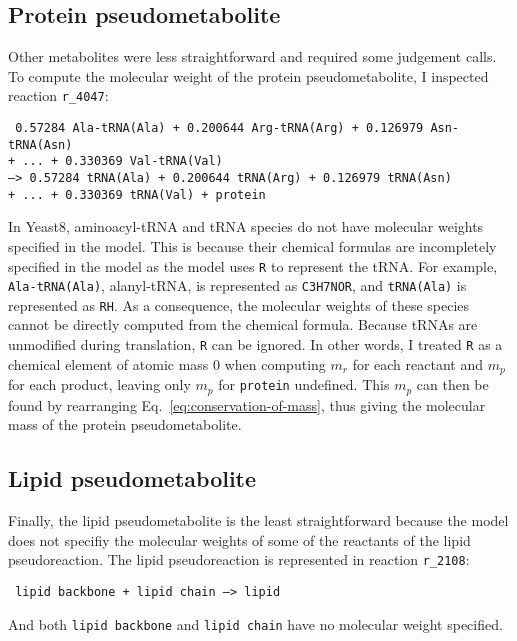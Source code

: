 \subsection{Protein pseudometabolite}
\label{append:model-molweights-protein}

Other metabolites were less straightforward and required some judgement calls.
To compute the molecular weight of the protein pseudometabolite, I inspected reaction \texttt{r\_4047}:

\texttt{
  0.57284 Ala-tRNA(Ala) + 0.200644 Arg-tRNA(Arg) + 0.126979 Asn-tRNA(Asn)\\
  + ... + 0.330369 Val-tRNA(Val) \\
  --> 0.57284 tRNA(Ala) + 0.200644 tRNA(Arg) + 0.126979 tRNA(Asn) \\
  + ... + 0.330369 tRNA(Val) + protein
}

In Yeast8, aminoacyl-tRNA and tRNA species do not have molecular weights specified in the model.
This is because their chemical formulas are incompletely specified in the model as the model uses \texttt{R} to represent the tRNA.
For example, \texttt{Ala-tRNA(Ala)}, alanyl-tRNA, is represented as \texttt{C3H7NOR}, and \texttt{tRNA(Ala)} is represented as \texttt{RH}.
As a consequence, the molecular weights of these species cannot be directly computed from the chemical formula.
Because tRNAs are unmodified during translation, \texttt{R} can be ignored.
In other words, I treated \texttt{R} as a chemical element of atomic mass 0 when computing $m_{r}$ for each reactant and $m_{p}$ for each product, leaving only $m_{p}$ for \texttt{protein} undefined.
This $m_{p}$ can then be found by rearranging Eq.\ \ref{eq:conservation-of-mass}, thus giving the molecular mass of the protein pseudometabolite.


\subsection{Lipid pseudometabolite}
\label{subsubsec:model-molweights-lipid}

Finally, the lipid pseudometabolite is the least straightforward because the model does not specifiy the molecular weights of some of the reactants of the lipid pseudoreaction.
The lipid pseudoreaction is represented in reaction \texttt{r\_2108}:

\texttt{
  lipid backbone + lipid chain --> lipid
}

And both \texttt{lipid backbone} and \texttt{lipid chain} have no molecular weight specified.

